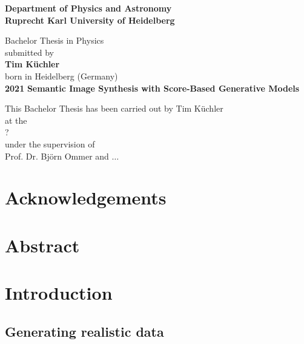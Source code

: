 \documentclass[a4paper, 12pt, oneside]{scrbook}
\begin{document}
\begin{titlepage}
\begin{center}
    \Large\textbf{Department of Physics and Astronomy\\Ruprecht Karl University of Heidelberg}
    
    \vfill
    
    \large
    Bachelor Thesis in Physics\\
    submitted by\\
    \vspace{0.5cm}
    \Large\textbf{Tim Küchler}\\
    \normalsize
    \vspace{0.5cm}
    born in Heidelberg (Germany)\\
    \vspace{0.5cm}
    \Large\textbf{2021}
    \normalsize
    \afterpage{\blankpage}
    \newpage
    \thispagestyle{empty}
    \Large\textbf{Semantic Image Synthesis with Score-Based Generative Models}
    
    \vfill
    
    \large
    This Bachelor Thesis has been carried out by Tim Küchler\\
    at the\\
    ?\\
    under the supervision of\\
    Prof. Dr. Björn Ommer and $\dots$
\end{center}
\end{titlepage}
%
\frontmatter 

\chapter{Acknowledgements}

\afterpage{\blankpage}

\chapter{Abstract}

\afterpage{\blankpage}

\setcounter{tocdepth}{1}
\tableofcontents

\mainmatter
\chapter{Introduction}
\section{Generating realistic data} %
\end{document}
